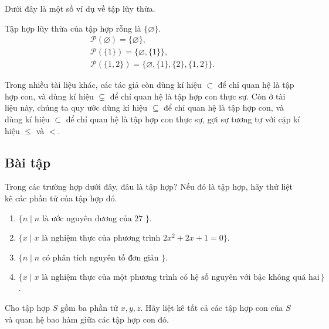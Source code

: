 Dưới đây là một số ví dụ về tập lũy thừa.

\begin{example}
    Tập hợp lũy thừa của tập hợp rỗng là $\{ \varnothing \}$.
    \begin{equation*}
        \begin{split}
            \mathcal{P}(\varnothing) = \{ \varnothing \}, \\
            \mathcal{P}(\{ 1 \}) = \{ \varnothing, \{ 1 \} \}, \\
            \mathcal{P}(\{ 1, 2 \}) = \{ \varnothing, \{ 1 \}, \{ 2 \}, \{ 1, 2 \} \}.
        \end{split}
    \end{equation*}
\end{example}

Trong nhiều tài liệu khác, các tác giả còn dùng kí hiệu $\subset$ để chỉ quan hệ là tập hợp con, và dùng kí hiệu $\subsetneq$ để chỉ quan hệ là tập hợp con thực sự. Còn ở tài liệu này, chúng ta quy ước dùng kí hiệu $\subseteq$ để chỉ quan hệ là tập hợp con, và dùng kí hiệu $\subset$ để chỉ quan hệ là tập hợp con thực sự, gợi sự tương tự với cặp kí hiệu $\leq$ và $<$.

\subsection{Bài tập}
\setcounter{exercise}{0}

\begin{exercise}\label{naive-set-theory:exercise1}
    Trong các trường hợp dưới đây, đâu là tập hợp? Nếu đó là tập hợp, hãy thử liệt kê các phần tử của tập hợp đó.
    \begin{enumerate}[label={(\alph*)},itemsep=0pt]
        \item $\{ n \mid n \text{ là ước nguyên dương của 27 } \}$.
        \item $\{ x \mid x \text{ là nghiệm thực của phương trình } 2x^{2} + 2x + 1 = 0 \}$.
        \item $\{ n \mid n \text{ có phân tích nguyên tố đơn giản } \}$.
        \item $\{ x \mid x \text{ là nghiệm thực của một phương trình có hệ số nguyên với bậc không quá hai } \}$.
    \end{enumerate}
\end{exercise}

\begin{exercise}\label{naive-set-theory:exercise2}
    Cho tập hợp $S$ gồm ba phần tử $x, y, z$. Hãy liệt kê tất cả các tập hợp con của $S$ và quan hệ bao hàm giữa các tập hợp con đó.
\end{exercise}

